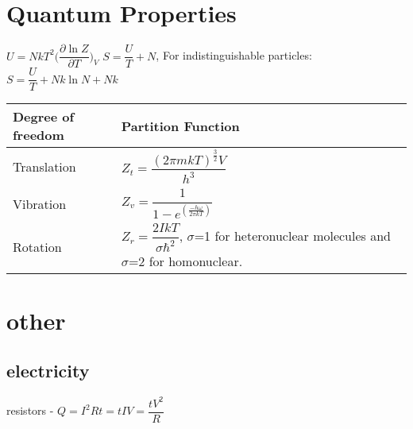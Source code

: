 \documentclass[8pt]{extarticle}
\begin{document}
\begin{small}
\begin{multicols*}{2}
\section{Quantum Properties}
$U=NkT^2\bigg(\dfrac{\partial\ln Z}{\partial T}\bigg)_V$ \hspace{.1in} $S=\dfrac{U}{T}+N$, For indistinguishable particles: $S=\dfrac{U}{T}+Nk\ln N+Nk$\\
\begin{tabular}{| p{2cm} | p{3cm} |}
\hline
Degree of freedom & Partition Function \\
\hline
Translation & $Z_t=\dfrac{(2\pi mkT)^{\frac{3}{2}}V}{h^3}$\\
\hline
Vibration & $Z_v=\dfrac{1}{1-e^{(\frac{-h\omega}{2\pi kT})}}$\\
\hline
Rotation & $Z_r=\dfrac{2IkT}{\sigma\hbar^2}$, $\sigma$=1 for heteronuclear molecules and $\sigma$=2 for homonuclear. \\
\hline
\end{tabular}
\section{other}
\subsection{electricity}
resistors - $Q=I^2Rt=tIV=\dfrac{tV^2}{R}$
\end{multicols*}
\end{small}
\end{document}
